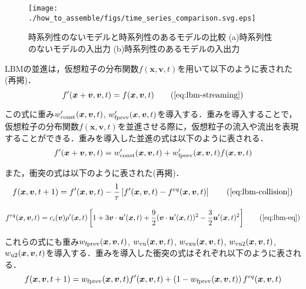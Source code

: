 \begin{figure}[bp]
  \centering
  \texttt{[image: ./how\_to\_assemble/figs/time\_series\_comparison.svg.eps]}
  \caption{時系列性のないモデルと時系列性のあるモデルの比較 (a)時系列性のないモデルの入出力 (b)時系列性のあるモデルの入出力}
  \label{fig:model-comparison}
\end{figure}

LBMの並進は，仮想粒子の分布関数$f(\bm{x}, \bm{v}, t)$を用いて以下のように表された(再掲)．
\begin{equation}
  f'(\bm{x}+\bm{v}, \bm{v}, t)
  = f(\bm{x}, \bm{v}, t)
  \tag{\ref{eq:lbm-streaming}}
\end{equation}

この式に重み$w'_{\rm{const}}(\bm{x}, \bm{v}, t)$, $w'_{\rm{fprev}}(\bm{x}, \bm{v}, t)$を導入する．重みを導入することで，仮想粒子の分布関数$f(\bm{x}, \bm{v}, t)$を並進させる際に，仮想粒子の流入や流出を表現することができる．重みを導入した並進の式は以下のように表される．
\begin{equation}
  f'(\bm{x}+\bm{v}, \bm{v}, t) = 
  w'_{\rm{const}}(\bm{x}, \bm{v}, t) + 
  w'_{\rm{fprev}}(\bm{x}, \bm{v}, t) f(\bm{x}, \bm{v}, t)
  \label{eq:weighted-streaming}
\end{equation}

また，衝突の式は以下のように表された(再掲)．
\begin{equation}
  f(\bm{x}, \bm{v}, t+1) = 
  f'(\bm{x}, \bm{v}, t) - 
  \frac{1}{\tau} \left[ 
    f'(\bm{x}, \bm{v}, t) - f^{eq}(\bm{x}, \bm{v}, t) 
  \right]
  \tag{\ref{eq:lbm-collision}}
\end{equation}

\begin{equation}
  f^{eq}(\bm{x}, \bm{v}, t) = 
  c_i(\bm{v}) \rho'(\bm{x}, t) \left[ 
    1 
    + 3\bm{v} \cdot \bm{u}'(\bm{x}, t) 
    + \frac{9}{2}(\bm{v} \cdot \bm{u}'(\bm{x}, t))^2 
    - \frac{3}{2}\bm{u}'(\bm{x}, t)^2 
  \right]
  \tag{\ref{eq:lbm-eq}}
\end{equation}

これらの式にも重み$w_{\rm{fprev}}(\bm{x}, \bm{v}, t)$, $w_{\rm{vu}}(\bm{x}, \bm{v}, t)$, $w_{\rm{vxu}}(\bm{x}, \bm{v}, t)$, $w_{\rm{vu2}}(\bm{x}, \bm{v}, t)$, $w_{\rm{u2}}(\bm{x}, \bm{v}, t)$を導入する．重みを導入した衝突の式はそれぞれ以下のように表される．
\begin{equation}
  f(\bm{x}, \bm{v}, t+1) = 
  w_{\rm{fprev}}(\bm{x}, \bm{v}, t) f'(\bm{x}, \bm{v}, t) 
  + \left(1 - w_{\rm{fprev}}(\bm{x}, \bm{v}, t)\right) f^{eq}(\bm{x}, \bm{v}, t)
  \label{eq:weighted-collision}
\end{equation}

